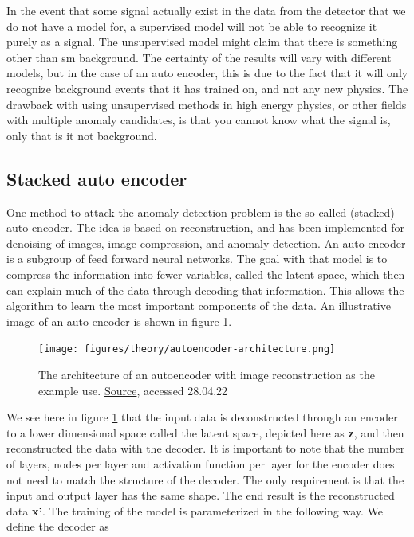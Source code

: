 \documentclass[ reprint, amsmath,amssymb, aps, nofootinbib]{revtex4-2}
\begin{document}
In the event that some signal actually exist in the data from the detector that we do not have a model for, a supervised model will not be able to recognize it purely as a signal. The unsupervised model might claim that there is something other than sm background. The certainty of the results will vary with different models, but in the case of an auto encoder, this is due to the fact that it will only recognize background events that it has trained on, and not any new physics. The drawback with using unsupervised methods in high energy physics, or other fields with multiple anomaly candidates, is that you cannot know what the signal is, only that is it not background. \par 



\subsection{Stacked auto encoder}
One method to attack the anomaly detection problem is the so called (stacked) auto encoder. The idea is based on reconstruction, and has been implemented for denoising of images, image compression, and anomaly detection. 
An auto encoder is a subgroup of feed forward neural networks\cite{FYSSTK}. The goal with that model is to compress the information into fewer variables, called the latent space, which then can explain much of the data through decoding that information. This allows the algorithm to learn the most important components of the data. An illustrative image of an auto encoder is shown in figure \ref{fig:auto_en_archi}. 

\begin{figure}[H]
    \centering
    \texttt{[image: figures/theory/autoencoder-architecture.png]}
    \caption{The architecture of an autoencoder with image reconstruction as the example use. \href{https://lilianweng.github.io/posts/2018-08-12-vae/}{Source}, accessed 28.04.22}
    \label{fig:auto_en_archi}
\end{figure}


We see here in figure \ref{fig:auto_en_archi} that the input data is deconstructed through an encoder to a lower dimensional space called the latent space, depicted here as \textbf{z}, and then reconstructed the data with the decoder. It is important to note that the number of layers, nodes per layer and activation function per layer for the encoder does not need to match the structure of the decoder. The only requirement is that the input and output layer has the same shape. The end result is the reconstructed data \textbf{x'}. The training of the model is parameterized in the following way. We define the decoder as 
\end{document}
